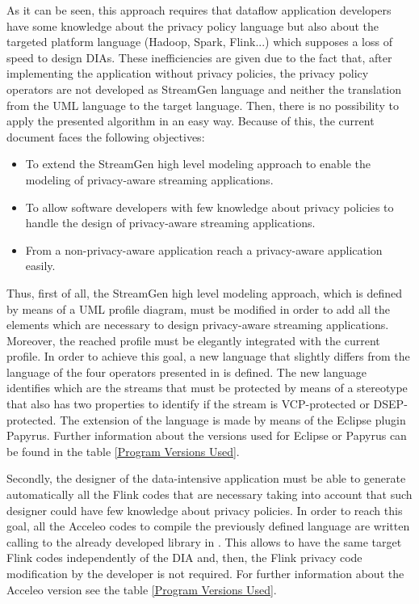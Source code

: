 As it can be seen, this approach requires that dataflow application developers have some knowledge about the privacy policy language but also about the targeted platform language (Hadoop, Spark, Flink...) which supposes a loss of speed to design DIAs. These inefficiencies are given due to the fact that, after implementing the application without privacy policies, the privacy policy operators are not developed as StreamGen language and neither the translation from the UML language to the target language. Then, there is no possibility to apply the presented algorithm in an easy way. Because of this, the current document faces the following objectives:

\begin{itemize}
\item To extend the StreamGen high level modeling approach to enable the modeling of privacy-aware streaming applications.
\item To allow software developers with few knowledge about privacy policies to handle the design of privacy-aware streaming applications.
\item From a non-privacy-aware application reach a privacy-aware application easily.
\end{itemize}

Thus, first of all, the StreamGen high level modeling approach, which is defined by means of a UML profile diagram, must be modified in order to add all the elements which are necessary to design privacy-aware streaming applications. Moreover, the reached profile must be elegantly integrated with the current profile. In order to achieve this goal, a new language that slightly differs from the language of the four operators presented in \cite{privacypoliciesarticle} is defined. The new language identifies which are the streams that must be protected by means of a stereotype that also has two properties to identify if the stream is VCP-protected or DSEP-protected. The extension of the language is made by means of the Eclipse plugin Papyrus. Further information about the versions used for Eclipse or Papyrus can be found in the table \ref{Program Versions Used}.

Secondly, the designer of the data-intensive application must be able to generate automatically all the Flink codes that are necessary taking into account that such designer could have few knowledge about privacy policies. In order to reach this goal, all the Acceleo codes to compile the previously defined language are written calling to the already developed library in \cite{privacypoliciesarticle}. This allows to have the same target Flink codes independently of the DIA and, then, the Flink privacy code modification by the developer is not required. For further information about the Acceleo version see the table \ref{Program Versions Used}.

